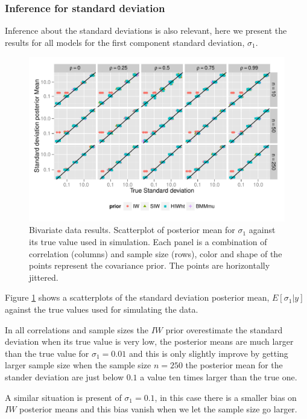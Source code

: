 \documentclass{article}
\begin{document}
\subsubsection{Inference for standard deviation}
Inference about the standard deviations is also relevant, here we present the results for all models for the first component standard deviation, $\sigma_1$. 
\begin{figure}[htbp]
   \centering
   \includegraphics[width=\textwidth]{fig_s1_d2} 
    \vspace{-.5in}
   \caption{Bivariate data results. Scatterplot of posterior mean for $\sigma_1$  against its true value used in simulation. Each panel is a combination of correlation (columns) and sample size (rows),  color and shape of the points represent the covariance prior. The points are horizontally jittered. \label{devF1} }
\end{figure}

Figure \ref{devF1} shows a scatterplots of the standard deviation posterior mean, $E[\sigma_1\vert y]$  against the true values used for simulating the data. 

In all correlations and sample sizes the $IW$ prior overestimate the standard deviation when its true value is very low, the posterior means are much larger than the true value for $\sigma_1=0.01$ and this is only slightly improve by getting larger sample size when the sample size $n=250$ the posterior mean for the stander deviation are just below $0.1$ a value ten times larger than the true one.  

A similar situation is present of $\sigma_1=0.1$, in this case there is a smaller bias on $IW$ posterior means and this bias vanish when we let the sample size go larger.  
\end{document}
